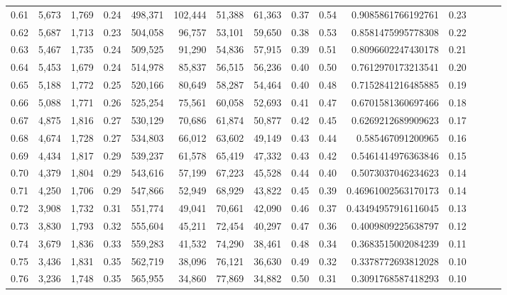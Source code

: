\begin{tabular}{rrrrrrrrrrrrrrr}
0.61 &   5,673 &  1,769 &  0.24 &  498,371 &  102,444 &   51,388 &   61,363 &  0.37 &  0.54 &      0.9085861766192761 &      0.23 \\
0.62 &   5,687 &  1,713 &  0.23 &  504,058 &   96,757 &   53,101 &   59,650 &  0.38 &  0.53 &      0.8581475995778308 &      0.22 \\
0.63 &   5,467 &  1,735 &  0.24 &  509,525 &   91,290 &   54,836 &   57,915 &  0.39 &  0.51 &      0.8096602247430178 &      0.21 \\
0.64 &   5,453 &  1,679 &  0.24 &  514,978 &   85,837 &   56,515 &   56,236 &  0.40 &  0.50 &      0.7612970173213541 &      0.20 \\
0.65 &   5,188 &  1,772 &  0.25 &  520,166 &   80,649 &   58,287 &   54,464 &  0.40 &  0.48 &      0.7152841216485885 &      0.19 \\
0.66 &   5,088 &  1,771 &  0.26 &  525,254 &   75,561 &   60,058 &   52,693 &  0.41 &  0.47 &      0.6701581360697466 &      0.18 \\
0.67 &   4,875 &  1,816 &  0.27 &  530,129 &   70,686 &   61,874 &   50,877 &  0.42 &  0.45 &      0.6269212689909623 &      0.17 \\
0.68 &   4,674 &  1,728 &  0.27 &  534,803 &   66,012 &   63,602 &   49,149 &  0.43 &  0.44 &       0.585467091200965 &      0.16 \\
0.69 &   4,434 &  1,817 &  0.29 &  539,237 &   61,578 &   65,419 &   47,332 &  0.43 &  0.42 &      0.5461414976363846 &      0.15 \\
0.70 &   4,379 &  1,804 &  0.29 &  543,616 &   57,199 &   67,223 &   45,528 &  0.44 &  0.40 &      0.5073037046234623 &      0.14 \\
0.71 &   4,250 &  1,706 &  0.29 &  547,866 &   52,949 &   68,929 &   43,822 &  0.45 &  0.39 &     0.46961002563170173 &      0.14 \\
0.72 &   3,908 &  1,732 &  0.31 &  551,774 &   49,041 &   70,661 &   42,090 &  0.46 &  0.37 &     0.43494957916116045 &      0.13 \\
0.73 &   3,830 &  1,793 &  0.32 &  555,604 &   45,211 &   72,454 &   40,297 &  0.47 &  0.36 &      0.4009809225638797 &      0.12 \\
0.74 &   3,679 &  1,836 &  0.33 &  559,283 &   41,532 &   74,290 &   38,461 &  0.48 &  0.34 &      0.3683515002084239 &      0.11 \\
0.75 &   3,436 &  1,831 &  0.35 &  562,719 &   38,096 &   76,121 &   36,630 &  0.49 &  0.32 &      0.3378772693812028 &      0.10 \\
0.76 &   3,236 &  1,748 &  0.35 &  565,955 &   34,860 &   77,869 &   34,882 &  0.50 &  0.31 &      0.3091768587418293 &      0.10 \\

\end{tabular}
